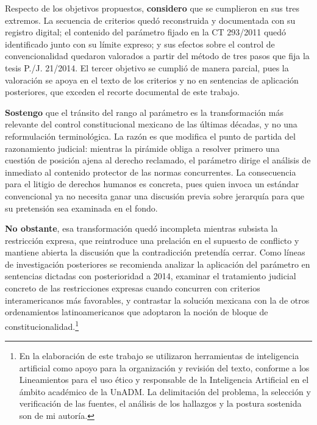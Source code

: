 \documentclass[
  spanish,
  letterpaper, oneside
]{article}
\begin{document}
Respecto de los objetivos propuestos, \textbf{considero} que se cumplieron en sus tres extremos. La secuencia de criterios quedó reconstruida y documentada con su registro digital; el contenido del parámetro fijado en la CT 293/2011 quedó identificado junto con su límite expreso; y sus efectos sobre el control de convencionalidad quedaron valorados a partir del método de tres pasos que fija la tesis P./J. 21/2014. El tercer objetivo se cumplió de manera parcial, pues la valoración se apoya en el texto de los criterios y no en sentencias de aplicación posteriores, que exceden el recorte documental de este trabajo.

\textbf{Sostengo} que el tránsito del rango al parámetro es la transformación más relevante del control constitucional mexicano de las últimas décadas, y no una reformulación terminológica. La razón es que modifica el punto de partida del razonamiento judicial: mientras la pirámide obliga a resolver primero una cuestión de posición ajena al derecho reclamado, el parámetro dirige el análisis de inmediato al contenido protector de las normas concurrentes. La consecuencia para el litigio de derechos humanos es concreta, pues quien invoca un estándar convencional ya no necesita ganar una discusión previa sobre jerarquía para que su pretensión sea examinada en el fondo.

\textbf{No obstante}, esa transformación quedó incompleta mientras subsista la restricción expresa, que reintroduce una prelación en el supuesto de conflicto y mantiene abierta la discusión que la contradicción pretendía cerrar. Como líneas de investigación posteriores se recomienda analizar la aplicación del parámetro en sentencias dictadas con posterioridad a 2014, examinar el tratamiento judicial concreto de las restricciones expresas cuando concurren con criterios interamericanos más favorables, y contrastar la solución mexicana con la de otros ordenamientos latinoamericanos que adoptaron la noción de bloque de constitucionalidad.\footnote{En la elaboración de este trabajo se utilizaron herramientas de inteligencia artificial como apoyo para la organización y revisión del texto, conforme a los Lineamientos para el uso ético y responsable de la Inteligencia Artificial en el ámbito académico de la UnADM. La delimitación del problema, la selección y verificación de las fuentes, el análisis de los hallazgos y la postura sostenida son de mi autoría.}

\clearpage

\end{document}
